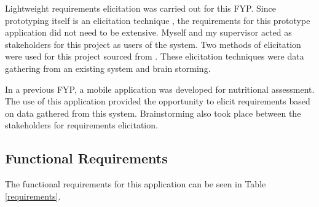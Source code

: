 Lightweight requirements elicitation was carried out for this FYP.
Since prototyping itself is an elicitation technique \parencite{reqs}, the requirements for this prototype application did not need to be extensive.
Myself and my supervisor acted as stakeholders for this project as users of the system.
Two methods of elicitation were used for this project sourced from \parencite{reqs}.
These elicitation techniques were data gathering from an existing system and brain storming.

In a previous FYP, a mobile application was developed for nutritional assessment.
The use of this application provided the opportunity to elicit requirements based on data gathered from this system. Brainstorming also took place between the stakeholders for requirements elicitation.

\tocless\subsection{Functional Requirements}
The functional requirements for this application can be seen in Table \ref{requirements}.

